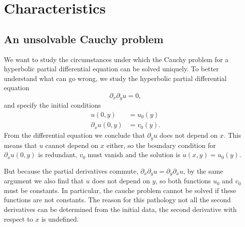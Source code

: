 %
%
%
\section{Characteristics}
\subsection{An unsolvable Cauchy problem}
We want to study the circumstances under which the Cauchy problem
for a hyperbolic partial differential equation can be solved
uniquely.
To better understand what can go wrong, we study the hyperbolic
partial differential equation
\[
\partial_x\partial_y u=0,
\]
and specify the initial conditions
\begin{align*}
u(0,y)&=u_0(y)
\\
\partial_xu(0,y)&=v_0(y).
\end{align*}
From the differential equation we conclude that $\partial_y u$
does not depend on $x$.
This means that $u$ cannot depend on $x$ either, so the boundary
condition for $\partial_xu(0,y)$ is redundant, $v_0$ must vanish
and the solution is $u(x,y)=u_0(y)$.

But because the partial derivatives commute,
$\partial_x\partial_yu=\partial_y\partial_xu$, by the same
argument we also find that $u$ does not depend on $y$, so both functions
$u_0$ and $v_0$ must be constants.
In particular, the cauche problem cannot be solved if these
functions are not constants.
The reason for this pathology not all the second derivatives can be
determined from the initial data, the second derivative with respect
to $x$ is undefined.


